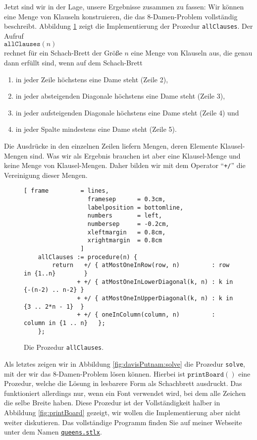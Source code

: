 Jetzt sind wir in der Lage, unsere Ergebnisse zusammen zu fassen:  Wir k\"{o}nnen eine
Menge von Klauseln konstruieren, die das 8-Damen-Problem vollst\"{a}ndig beschreibt.
Abbildung \ref{fig:allClauses} zeigt die Implementierung der Prozedur \texttt{allClauses}.
Der Aufruf \\[0.2cm]
\hspace*{1.3cm} $\texttt{allClauses}(n)$ \\[0.2cm]
rechnet f\"{u}r ein Schach-Brett der Gr\"{o}\ss{}e $n$ eine Menge von Klauseln aus, die
genau dann erf\"{u}llt sind, wenn auf dem Schach-Brett
\begin{enumerate}
\item in jeder Zeile h\"{o}chstens eine Dame steht (Zeile 2),
\item in jeder absteigenden Diagonale h\"{o}chstens eine Dame steht (Zeile 3),
\item in jeder aufsteigenden Diagonale h\"{o}chstens eine Dame steht (Zeile 4) und
\item in jeder Spalte mindestens eine Dame steht (Zeile 5).
\end{enumerate}
Die Ausdr\"{u}cke in den einzelnen Zeilen liefern Mengen, deren Elemente
Klausel-Mengen sind.  Was wir als Ergebnis brauchen ist aber eine Klausel-Menge
und keine Menge von Klausel-Mengen.  Daher bilden wir mit dem Operator ``\texttt{+/}''
die Vereinigung dieser Mengen.

\begin{figure}[!ht]
  \centering
\begin{Verbatim}[ frame         = lines, 
                  framesep      = 0.3cm, 
                  labelposition = bottomline,
                  numbers       = left,
                  numbersep     = -0.2cm,
                  xleftmargin   = 0.8cm,
                  xrightmargin  = 0.8cm
                ]
    allClauses := procedure(n) {
        return   +/ { atMostOneInRow(row, n)         : row in {1..n}        }
               + +/ { atMostOneInLowerDiagonal(k, n) : k in {-(n-2) .. n-2} }
               + +/ { atMostOneInUpperDiagonal(k, n) : k in {3 .. 2*n - 1}  }
               + +/ { oneInColumn(column, n)         : column in {1 .. n}   };
    };
\end{Verbatim}
\vspace*{-0.3cm}
  \caption{Die Prozedur \texttt{allClauses}.}
  \label{fig:allClauses}
\end{figure}

Als letztes zeigen wir in Abbildung \ref{fig:davisPutnam:solve} die Prozedur
\texttt{solve}, mit der wir das 8-Damen-Problem l\"{o}sen k\"{o}nnen.
Hierbei ist $\texttt{printBoard}()$ eine Prozedur, welche die L\"{o}sung in lesbarere Form als Schachbrett
ausdruckt.  Das funktioniert allerdings nur, wenn ein Font verwendet wird, bei dem alle Zeichen die
selbe Breite haben.  Diese Prozedur ist der Vollst\"{a}ndigkeit halber in Abbildung \ref{fig:printBoard}
gezeigt, wir wollen die Implementierung aber nicht weiter diskutieren.
Das vollst\"{a}ndige Programm finden Sie auf meiner Webseite unter dem Namen
\href{https://github.com/karlstroetmann/Logik/blob/master/SetlX/queens.stlx}{\texttt{queens.stlx}}.


